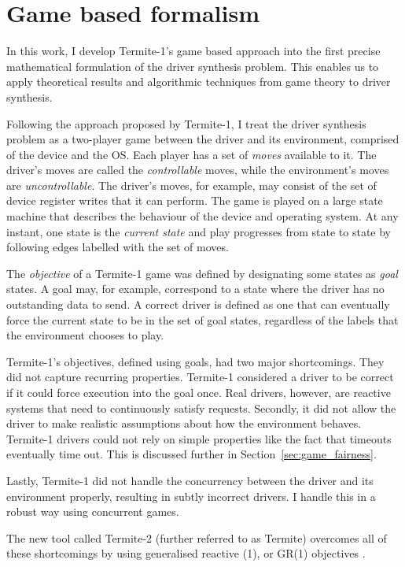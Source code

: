 \section{Game based formalism}

In this work, I develop Termite-1's game based approach into the first precise mathematical formulation of the driver synthesis problem.  This enables us to apply theoretical results and algorithmic techniques from game theory to driver synthesis. 

Following the approach proposed by Termite-1, I treat the driver synthesis problem as a two-player game between the driver and its environment, comprised of the device and the OS\@. Each player has a set of \emph{moves} available to it. The driver's moves are called the \emph{controllable} moves, while the environment's moves are \emph{uncontrollable}. The driver's moves, for example, may consist of the set of device register writes that it can perform. The game is played on a large state machine that describes the behaviour of the device and operating system. At any instant, one state is the \emph{current state} and play progresses from state to state by following edges labelled with the set of moves. 

The \emph{objective} of a Termite-1 game was defined by designating some states as \emph{goal} states. A goal may, for example, correspond to a state where the driver has no outstanding data to send. A correct driver is defined as one that can eventually force the current state to be in the set of goal states, regardless of the labels that the environment chooses to play. 

Termite-1's objectives, defined using goals, had two major shortcomings. They did not capture recurring properties. Termite-1 considered a driver to be correct if it could force execution into the goal once. Real drivers, however, are reactive systems that need to continuously satisfy requests. Secondly, it did not allow the driver to make realistic assumptions about how the environment behaves. Termite-1 drivers could not rely on simple properties like the fact that timeouts eventually time out. This is discussed further in Section~\ref{sec:game_fairness}. 

Lastly, Termite-1 did not handle the concurrency between the driver and its environment properly, resulting in subtly incorrect drivers. I handle this in a robust way using concurrent games. 

The new tool called Termite-2 (further referred to as Termite) overcomes all of these shortcomings by using generalised reactive (1), or GR(1) objectives \cite{Piterman_PS_06}.

